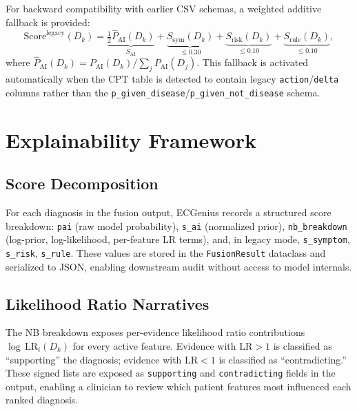 \documentclass[journal]{IEEEtran}
\begin{document}
For backward compatibility with earlier CSV schemas, a weighted
additive fallback is provided:
\begin{equation}
  \text{Score}^{\text{legacy}}(D_k) =
  \underbrace{\tfrac{1}{2} \hat{P}_{\text{AI}}(D_k)}_{S_{\text{AI}}}
  + \underbrace{S_{\text{sym}}(D_k)}_{\leq 0.30}
  + \underbrace{S_{\text{risk}}(D_k)}_{\leq 0.10}
  + \underbrace{S_{\text{rule}}(D_k)}_{\leq 0.10},
  \label{eq:legacy}
\end{equation}
where $\hat{P}_{\text{AI}}(D_k) = P_{\text{AI}}(D_k) / \sum_j P_{\text{AI}}(D_j)$.
This fallback is activated automatically when the CPT table is
detected to contain legacy \texttt{action}/\texttt{delta} columns
rather than the \texttt{p\_given\_disease}/\texttt{p\_given\_not\_disease}
schema.

\section{Explainability Framework}
\label{sec:explainability}

\subsection{Score Decomposition}

For each diagnosis in the fusion output, ECGenius records a
structured score breakdown:
\texttt{pai} (raw model probability),
\texttt{s\_ai} (normalized prior),
\texttt{nb\_breakdown} (log-prior, log-likelihood, per-feature LR terms),
and, in legacy mode, \texttt{s\_symptom}, \texttt{s\_risk}, \texttt{s\_rule}.
These values are stored in the \texttt{FusionResult} dataclass and
serialized to JSON, enabling downstream audit without access to
model internals.

\subsection{Likelihood Ratio Narratives}

The NB breakdown exposes per-evidence likelihood ratio contributions
$\log\,\text{LR}_i(D_k)$ for every active feature.
Evidence with $\text{LR} > 1$ is classified as ``supporting'' the
diagnosis; evidence with $\text{LR} < 1$ is classified as
``contradicting.''
These signed lists are exposed as \texttt{supporting} and
\texttt{contradicting} fields in the output, enabling a clinician
to review which patient features most influenced each ranked
diagnosis.
\end{document}
